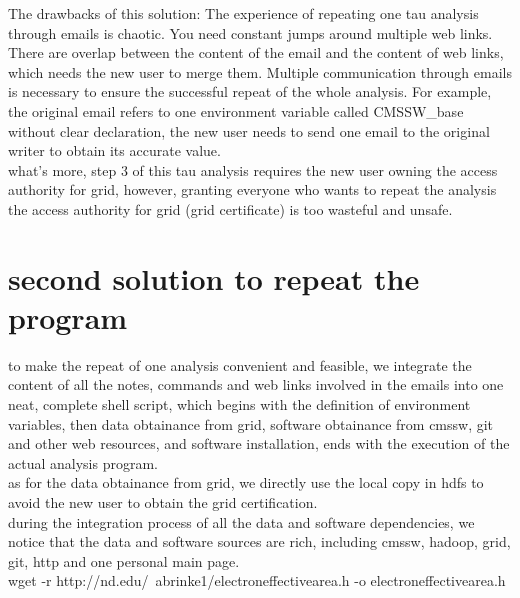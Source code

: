 \documentclass{article}
\begin{document}
The drawbacks of this solution: The experience of repeating one tau analysis through emails is chaotic. You need constant jumps around multiple web links. There are overlap between the content of the email and the content of web links, which needs the new user to merge them. Multiple communication through emails is necessary to ensure the successful repeat of the whole analysis. For example, the original email refers to one environment variable called CMSSW\_base without clear declaration, the new user needs to send one email to the original writer to obtain its accurate value.\\

what’s more, step 3 of this tau analysis requires the new user owning the access authority for grid, however, granting  everyone who wants to repeat the analysis the access authority for grid (grid certificate) is too wasteful and unsafe.\\

\section{second solution to repeat the program}
to make the repeat of one analysis convenient and feasible, we integrate the content of all the notes, commands and web links involved in the emails into one neat, complete shell script, which begins with the definition of environment variables, then data obtainance from grid, software obtainance from cmssw, git and other web resources, and software installation, ends with the execution of the actual analysis program.\\

as for the data obtainance from grid, we directly use the local copy in hdfs to avoid the new user to obtain the grid certification.\\

during the integration process of all the data and software dependencies, we notice that the data and software sources are rich, including cmssw, hadoop, grid, git, http and one personal main page. \\
wget -r http://nd.edu/~abrinke1/electroneffectivearea.h -o electroneffectivearea.h\\ 
\end{document}
